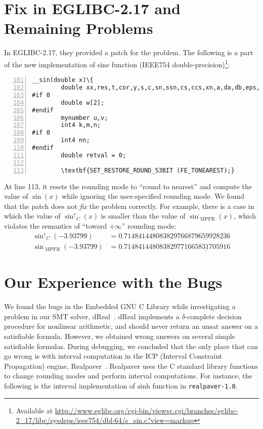 \documentclass{llncs}
\newcommand{\rup}[1]{\ensuremath{\mathrm{#1}^{\uparrow}}}
\newcommand{\rne}[1]{\ensuremath{\mathrm{#1}^{\cdot}}}
\begin{document}
\section{Fix in EGLIBC-2.17 and Remaining Problems}\label{sec:fix}

In EGLIBC-2.17, they provided a patch for the problem. The following
is a part of the new implementation of sine function (IEEE754
double-precision)\footnote{Available at
  \url{http://www.eglibc.org/cgi-bin/viewvc.cgi/branches/eglibc-2_17/libc/sysdeps/ieee754/dbl-64/s_sin.c?view=markup}}:

\begin{Verbatim}[numbers=left, frame=single, firstnumber=101,
  commandchars=\\\{\}, fontsize=\relsize{-1},
  label={\texttt{eglibc-2.17/libc/sysdeps/ieee754/dbl-64/s\_sin.c}},
  labelposition=topline ]
__sin(double x)\{
        double xx,res,t,cor,y,s,c,sn,ssn,cs,ccs,xn,a,da,db,eps,xn1,xn2;
#if 0
        double w[2];
#endif
        mynumber u,v;
        int4 k,m,n;
#if 0
        int4 nn;
#endif
        double retval = 0;

        \textbf{SET_RESTORE_ROUND_53BIT (FE_TONEAREST);}
\end{Verbatim}

At line 113, it resets the rounding mode to ``round to nearest'' and
compute the value of $\sin(x)$ while ignoring the user-specified
rounding mode. We found that the patch does not \emph{fix} the problem
correctly. For example, there is a case in which the value of
$\rup{\sin}_{C}(x)$ is smaller than the value of
$\rne{\sin}_{\mathrm{MPFR}}(x)$, which violates the semantics of
``toward $+\infty$'' rounding mode:
\begin{align*}
            \rup{\sin}_{C}(-3.93799) & = 0.7148414480838297\underline{66879659928236}\\
   \rne{\sin}_{\mathrm{MPFR}}(-3.93799) & = 0.7148414480838297\underline{71665831705916}
\end{align*}

\section{Our Experience with the Bugs}\label{sec:experience}
We found the bugs in the Embedded GNU C Library while investigating a
problem in our SMT solver, dReal~\cite{DBLP:conf/cade/GaoKC13}. dReal
implements a $\delta$-complete decision procedure for nonlinear
arithmetic, and should never return an {\sf unsat} answer on a
satisfiable formula. However, we obtained wrong answers on several
simple satisfiable formulas. During debugging, we concluded that the
only place that can go wrong is with interval computation in the ICP
(Interval Constraint Propagation) engine,
Realpaver~\cite{Granvilliers:2006:ARI:1132973.1132980}. Realpaver uses
the C standard library functions to change rounding modes and perform
interval computations. For instance, the following is the interval
implementation of $\mathrm{sinh}$ function in \texttt{realpaver-1.0}.
\end{document}
